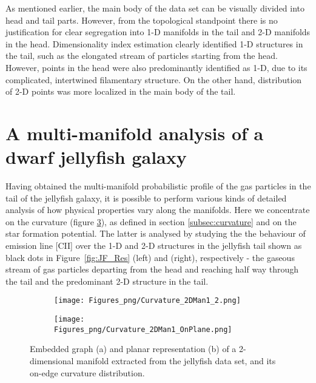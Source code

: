 As mentioned earlier, the main body of the data set can be visually divided into head and tail parts.
However, from the topological standpoint there is no justification for clear segregation into 1-D manifolds in the tail and 2-D manifolds in the head.
Dimensionality index estimation clearly identified 1-D structures in the tail, such as the elongated stream of particles starting from the head.
However, points in the head were also predominantly identified as 1-D, due to its complicated, intertwined filamentary structure.
On the other hand, distribution of 2-D points was more localized in the main body of the tail.


\section{A multi-manifold analysis of a dwarf jellyfish galaxy}\label{sec:manifold_jellyfish}

Having obtained the multi-manifold probabilistic profile of the gas particles in the tail of the jellyfish galaxy,
it is possible to perform various kinds of detailed analysis of how physical properties vary along the manifolds.
Here we concentrate on the curvature (figure \ref{fig:curvatureJF}), as defined in section \ref{subsec:curvature} and on the star formation potential.
The latter is analysed by studying the the behaviour of emission line [CII] over the 1-D and 2-D structures
in the jellyfish tail shown as black dots in Figure~\ref{fig:JF_Res} (left) and (right), respectively
- the gaseous stream of gas particles departing from the head and reaching half way through the tail and the predominant 2-D structure in the tail.
\begin{figure}[ht]
\centering
\begin{subfigure}[t]{0.49\textwidth}
 \caption{}
 \label{subfig:CurvJF}
 \texttt{[image: Figures\_png/Curvature\_2DMan1\_2.png]}
\end{subfigure}
\begin{subfigure}[t]{0.49\textwidth}
 \caption{}
 \label{subfig:CurvJF_Plane}
 \texttt{[image: Figures\_png/Curvature\_2DMan1\_OnPlane.png]}
\end{subfigure}
\caption{Embedded graph (a) and planar representation (b) of a 2-dimensional manifold extracted from the jellyfish data set, and its on-edge curvature distribution.}
\label{fig:curvatureJF}
\end{figure}

